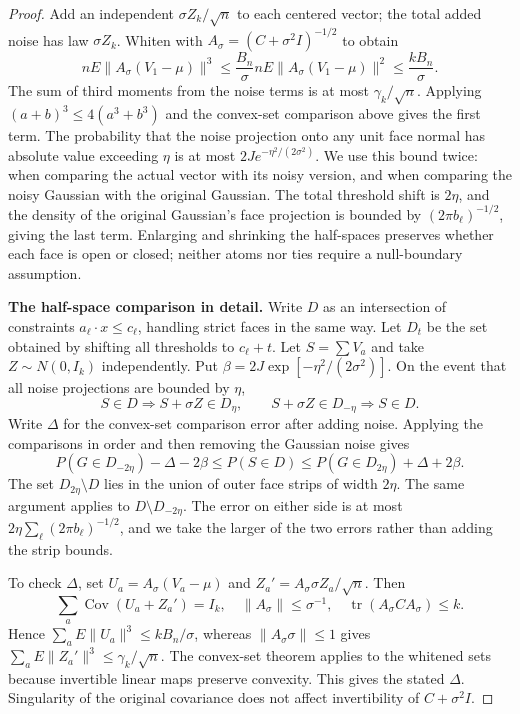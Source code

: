 \documentclass[a4paper,11pt]{article}
\theoremstyle{remark}
\begin{document}
\begin{proof}
Add an independent $\sigma Z_k/\sqrt n$ to each centered vector; the total added noise has law $\sigma Z_k$.
Whiten with $A_\sigma=(C+\sigma^2I)^{-1/2}$ to obtain
\[
 nE\|A_\sigma(V_1-\mu)\|^3
 \le\frac{B_n}{\sigma}nE\|A_\sigma(V_1-\mu)\|^2
 \le\frac{kB_n}{\sigma}.
\]
The sum of third moments from the noise terms is at most $\gamma_k/\sqrt n$. Applying $(a+b)^3\le4(a^3+b^3)$
and the convex-set comparison above gives the first term.
The probability that the noise projection onto any unit face normal has absolute value exceeding $\eta$ is at most
$2Je^{-\eta^2/(2\sigma^2)}$. We use this bound twice: when comparing the actual vector with its noisy version, and when comparing
the noisy Gaussian with the original Gaussian. The total threshold shift is $2\eta$, and the density of the original Gaussian's face projection
is bounded by $(2\pi b_\ell)^{-1/2}$, giving the last term.
Enlarging and shrinking the half-spaces preserves whether each face is open or closed; neither atoms nor ties require a null-boundary assumption.

\medskip\noindent\textbf{The half-space comparison in detail.}
Write $D$ as an intersection of constraints $a_\ell\cdot x\le c_\ell$, handling strict faces in the same way.
Let $D_t$ be the set obtained by shifting all thresholds to $c_\ell+t$.
Let $S=\sum V_a$ and take $Z\sim N(0,I_k)$ independently. Put
$\beta=2J\exp[-\eta^2/(2\sigma^2)]$. On the event that all noise projections are bounded by $\eta$,
\[
 S\in D\Longrightarrow S+\sigma Z\in D_\eta,
 \qquad S+\sigma Z\in D_{-\eta}\Longrightarrow S\in D.
\]
Write $\Delta$ for the convex-set comparison error after adding noise. Applying the comparisons in order and then removing the Gaussian noise gives
\[
 P(G\in D_{-2\eta})-\Delta-2\beta
 \le P(S\in D)
 \le P(G\in D_{2\eta})+\Delta+2\beta.
\]
The set $D_{2\eta}\setminus D$ lies in the union of outer face strips of width $2\eta$.
The same argument applies to $D\setminus D_{-2\eta}$. The error on either side is at most
$2\eta\sum_\ell(2\pi b_\ell)^{-1/2}$, and we take the larger of the two errors
rather than adding the strip bounds.

To check $\Delta$, set $U_a=A_\sigma(V_a-\mu)$ and
$Z_a'=A_\sigma\sigma Z_a/\sqrt n$. Then
\[
 \sum_a\operatorname{Cov}(U_a+Z_a')=I_k,\quad
 \|A_\sigma\|\le\sigma^{-1},\quad
 \operatorname{tr}(A_\sigma C A_\sigma)\le k.
\]
Hence $\sum_aE\|U_a\|^3\le kB_n/\sigma$,
whereas $\|A_\sigma\sigma\|\le1$ gives
$\sum_aE\|Z_a'\|^3\le\gamma_k/\sqrt n$.
The convex-set theorem applies to the whitened sets because invertible linear maps preserve convexity. This gives the stated $\Delta$.
Singularity of the original covariance does not affect invertibility of $C+\sigma^2I$.

\end{proof}
\end{document}

